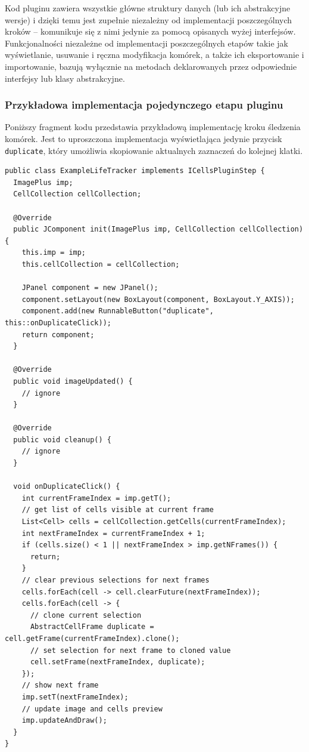 \documentclass[declaration,shortabstract,mgr]{iithesis}
\begin{document}
Kod pluginu zawiera wszystkie główne struktury danych (lub ich abstrakcyjne wersje) i dzięki temu jest zupełnie niezależny od implementacji poszczególnych kroków -- komunikuje się z nimi jedynie za pomocą opisanych wyżej interfejsów.
Funkcjonalności niezależne od implementacji poszczególnych etapów takie jak wyświetlanie, usuwanie i ręczna modyfikacja komórek, a także ich eksportowanie i importowanie, bazują wyłącznie na metodach deklarowanych przez odpowiednie interfejsy lub klasy abstrakcyjne.

\subsubsection{Przykładowa implementacja pojedynczego etapu pluginu}

Poniższy fragment kodu przedstawia przykładową implementację kroku śledzenia komórek.
Jest to uproszczona implementacja wyświetlająca jedynie przycisk \texttt{duplicate}, który umożliwia skopiowanie aktualnych zaznaczeń do kolejnej klatki.

\par\bigskip
  
\begin{lstlisting}
public class ExampleLifeTracker implements ICellsPluginStep {
  ImagePlus imp;
  CellCollection cellCollection;

  @Override
  public JComponent init(ImagePlus imp, CellCollection cellCollection) {
    this.imp = imp;
    this.cellCollection = cellCollection;

    JPanel component = new JPanel();
    component.setLayout(new BoxLayout(component, BoxLayout.Y_AXIS));
    component.add(new RunnableButton("duplicate", this::onDuplicateClick));
    return component;
  }

  @Override
  public void imageUpdated() {
    // ignore
  }

  @Override
  public void cleanup() {
    // ignore
  }

  void onDuplicateClick() {
    int currentFrameIndex = imp.getT();
    // get list of cells visible at current frame
    List<Cell> cells = cellCollection.getCells(currentFrameIndex);
    int nextFrameIndex = currentFrameIndex + 1;
    if (cells.size() < 1 || nextFrameIndex > imp.getNFrames()) {
      return;
    }
    // clear previous selections for next frames
    cells.forEach(cell -> cell.clearFuture(nextFrameIndex));
    cells.forEach(cell -> {
      // clone current selection
      AbstractCellFrame duplicate = cell.getFrame(currentFrameIndex).clone();
      // set selection for next frame to cloned value
      cell.setFrame(nextFrameIndex, duplicate);
    });
    // show next frame
    imp.setT(nextFrameIndex);
    // update image and cells preview
    imp.updateAndDraw();
  }
}
\end{lstlisting}
\end{document}
